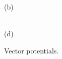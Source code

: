 \begin{figure}[h!]
\begin{minipage}[h]{0.5\linewidth}
\end{minipage}
\begin{minipage}[h]{0.5\linewidth}
 (b) \\
\end{minipage}
\hfill
\begin{minipage}[h]{0.5\linewidth}
 \\(d)
\end{minipage}
\caption{Vector potentials.}
\label{fig:Pulses_5}
\end{figure}

\clearpage



